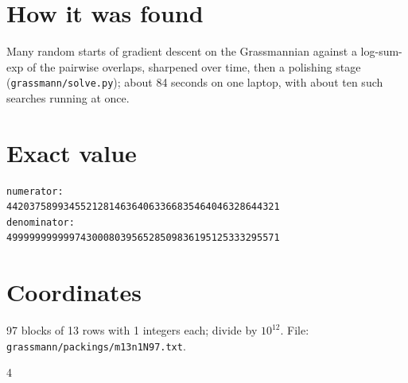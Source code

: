 \documentclass[11pt,a4paper]{article}
\begin{document}
\section{How it was found}
Many random starts of gradient descent on the Grassmannian against a log-sum-exp of the pairwise overlaps, sharpened over time, then a polishing stage (\texttt{grassmann/solve.py}); about 84 seconds on one laptop, with about ten such searches running at once.


\appendix
\section{Exact value}
{\small
\begin{verbatim}
numerator:
442037589934552128146364063366835464046328644321
denominator:
499999999999743000803956528509836195125333295571
\end{verbatim}}

\section{Coordinates}
97 blocks of 13 rows with 1 integers each; divide by $10^{12}$. File: \texttt{grassmann/packings/m13n1N97.txt}.
{\tiny
\begin{multicols}{4}
\end{multicols}}
\end{document}
